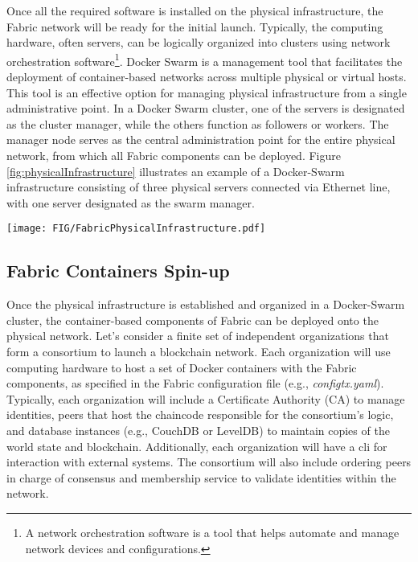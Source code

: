 \documentclass[conference]{IEEEtran}
\begin{document}
%

Once all the required software is installed on the physical infrastructure, the Fabric network will be ready for the initial launch. Typically, the computing hardware, often servers, can be logically organized into clusters using network orchestration software\footnote{A network orchestration software is a tool that helps automate and manage network devices and configurations.}. Docker Swarm is a management tool that facilitates the deployment of container-based networks across multiple physical or virtual hosts. This tool is an effective option for managing physical infrastructure from a single administrative point. In a Docker Swarm cluster, one of the servers is designated as the cluster manager, while the others function as followers or workers. The manager node serves as the central administration point for the entire physical network, from which all Fabric components can be deployed. Figure \ref{fig:physicalInfrastructure} illustrates an example of a Docker-Swarm infrastructure consisting of three physical servers connected via Ethernet line, with one server designated as the swarm manager.
%
\begin{figure*}
    \centering
    \texttt{[image: FIG/FabricPhysicalInfrastructure.pdf]}
    \caption{Fabric physical infrastructure.}
    \label{fig:physicalInfrastructure}
\end{figure*}
%

\subsection{Fabric Containers Spin-up}
Once the physical infrastructure is established and organized in a Docker-Swarm cluster, the container-based components of Fabric can be deployed onto the physical network. Let's consider a finite set of independent organizations that form a consortium to launch a blockchain network. Each organization will use computing hardware to host a set of Docker containers with the Fabric components, as specified in the Fabric configuration file (e.g., \textit{configtx.yaml}). Typically, each organization will include a Certificate Authority (CA) to manage identities, peers that host the chaincode responsible for the consortium's logic, and database instances (e.g., CouchDB or LevelDB) to maintain copies of the world state and blockchain. Additionally, each organization will have a \ac{cli} for interaction with external systems. The consortium will also include ordering peers in charge of consensus and membership service to validate identities within the network. \\
\end{document}
